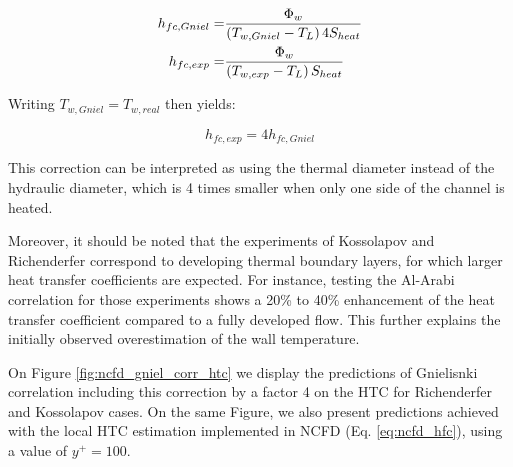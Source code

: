 \begin{align}
h_{fc,Gniel} =& \frac{\Phi_{w}}{\left( T_{w,Gniel}-T_{L} \right) 4S_{heat}} \\
h_{fc,exp} =& \frac{\Phi_{w}}{\left( T_{w,exp}-T_{L} \right) S_{heat}}
\end{align}

Writing $T_{w,Gniel}=T_{w,real}$ then yields:

\begin{equation}
h_{fc,exp}=4h_{fc,Gniel}
\end{equation}

\begin{remark*}{}
This correction can be interpreted as using the thermal diameter instead of the hydraulic diameter, which is 4 times smaller when only one side of the channel is heated.

\npar

Moreover, it should be noted that the experiments of Kossolapov and Richenderfer correspond to developing thermal boundary layers, for which larger heat transfer coefficients are expected. For instance, testing the Al-Arabi correlation \cite{al-arabi_turbulent_1982} for those experiments shows a 20\% to 40\% enhancement of the heat transfer coefficient compared to a fully developed flow. This further explains the initially observed overestimation of the wall temperature.
\end{remark*}

\npar
On Figure \ref{fig:ncfd_gniel_corr_htc} we display the predictions of Gnielisnki correlation including this correction by a factor 4 on the HTC for Richenderfer and Kossolapov cases. On the same Figure, we also present predictions achieved with the local HTC estimation implemented in NCFD (Eq. \ref{eq:ncfd_hfc}), using a value of $y^{+}=100$. 


